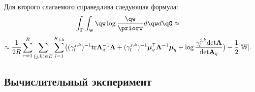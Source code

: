 Для второго слагаемого справедлива следующая формула:
\[
    \int_{\G}\int_{\w}\qw\log\frac{\qw}{\priorw}d\qw d\qG \approx
\]
\[
\approx \frac{1}{2R}\sum_{r=1}^R \sum_{(j,k) \in E} \sum_{l=1}^{K_{j,k}} \bigl( (\gamma^{j,k}_l)^{-1}\text{tr}\mathbf{A}_q^{-1}\mathbf{A} + (\gamma^{j,k}_l)^{-1} \boldsymbol{\mu}_q^{\mathsf{T}}\mathbf{A}^{-1}\boldsymbol{\mu}_q + \log \frac{\gamma^{j,k}_l\text{det}\mathbf{A}}{\text{det}\mathbf{A}_q}  \bigr) - \frac{1}{2}|\mathbb{W}|.
\]
\subsection{Вычислительный эксперимент}


